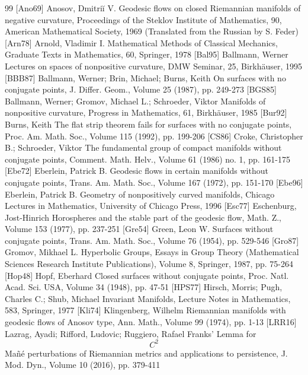 \begin{thebibliography}{99}
 [Ano69] Anosov, Dmitriĭ V. Geodesic flows on closed Riemannian manifolds of negative curvature, Proceedings of the Steklov Institute of Mathematics, 90, American Mathematical Society, 1969 (Translated from the Russian by S. Feder)
 [Arn78] Arnold, Vladimir I. Mathematical Methods of Classical Mechanics, Graduate Texts in Mathematics, 60, Springer, 1978
 [Bal95] Ballmann, Werner Lectures on spaces of nonpositive curvature, DMW Seminar, 25, Birkhäuser, 1995
 [BBB87] Ballmann, Werner; Brin, Michael; Burns, Keith On surfaces with no conjugate points, J. Differ. Geom., Volume 25 (1987), pp. 249-273
 [BGS85] Ballmann, Werner; Gromov, Michael L.; Schroeder, Viktor Manifolds of nonpositive curvature, Progress in Mathematics, 61, Birkhäuser, 1985
 [Bur92] Burns, Keith The flat strip theorem fails for surfaces with no conjugate points, Proc. Am. Math. Soc., Volume 115 (1992), pp. 199-206
 [CS86] Croke, Christopher B.; Schroeder, Viktor The fundamental group of compact manifolds without conjugate points, Comment. Math. Helv., Volume 61 (1986) no. 1, pp. 161-175
 [Ebe72] Eberlein, Patrick B. Geodesic flows in certain manifolds without conjugate points, Trans. Am. Math. Soc., Volume 167 (1972), pp. 151-170
 [Ebe96] Eberlein, Patrick B. Geometry of nonpositively curved manifolds, Chicago Lectures in Mathematics, University of Chicago Press, 1996
 [Esc77] Eschenburg, Jost-Hinrich Horospheres and the stable part of the geodesic flow, Math. Z., Volume 153 (1977), pp. 237-251
 [Gre54] Green, Leon W. Surfaces without conjugate points, Trans. Am. Math. Soc., Volume 76 (1954), pp. 529-546
 [Gro87] Gromov, Mikhael L. Hyperbolic Groups, Essays in Group Theory (Mathematical Sciences Research Institute Publications), Volume 8, Springer, 1987, pp. 75-264
 [Hop48] Hopf, Eberhard Closed surfaces without conjugate points, Proc. Natl. Acad. Sci. USA, Volume 34 (1948), pp. 47-51
 [HPS77] Hirsch, Morris; Pugh, Charles C.; Shub, Michael Invariant Manifolds, Lecture Notes in Mathematics, 583, Springer, 1977
 [Kli74] Klingenberg, Wilhelm Riemannian manifolds with geodesic flows of Anosov type, Ann. Math., Volume 99 (1974), pp. 1-13
 [LRR16] Lazrag, Ayadi; Rifford, Ludovic; Ruggiero, Rafael Franks’ Lemma for $${C}^{2}$$ Mañé perturbations of Riemannian metrics and applications to persistence, J. Mod. Dyn., Volume 10 (2016), pp. 379-411

\end{thebibliography}
